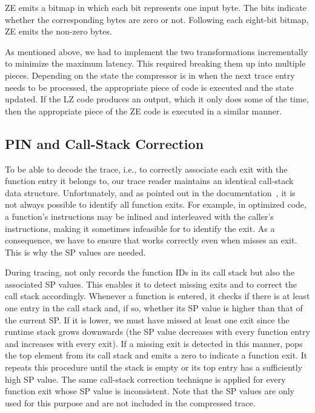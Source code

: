 ZE emits a bitmap in which each bit represents one input byte. The bits indicate whether the corresponding bytes are zero or not. Following each eight-bit bitmap, ZE emits the non-zero bytes.

As mentioned above, we had to implement the two transformations incrementally to minimize the maximum latency. This required breaking them up into multiple pieces. Depending on the state the compressor is in when the next trace entry needs to be processed, the appropriate piece of code is executed and the state updated. If the LZ code produces an output, which it only does some of the time, then the appropriate piece of the ZE code is executed in a similar manner.


\subsection{PIN and Call-Stack Correction}
\label{subsec:stack_cor}

To be able to decode the trace, i.e., to correctly associate each exit with the function entry it belongs to, our trace reader maintains an identical call-stack data structure. Unfortunately, and as pointed out in the \pin documentation~\cite{pinurl}, it is not always possible to identify all function exits. For example, in optimized code, a function's instructions may be inlined and interleaved with the caller's instructions, making it sometimes infeasible for \pin to identify the exit. As a consequence, we have to ensure that \parlot works correctly even when \pin misses an exit. This is why the SP values are needed.

During tracing, \parlot not only records the function IDs in its call stack but also the associated SP values. This enables it to detect missing exits and to correct the call stack accordingly. Whenever a function is entered, it checks if there is at least one entry in the call stack and, if so, whether its SP value is higher than that of the current SP. If it is lower, we must have missed at least one exit since the runtime stack grows downwards (the SP value decreases with every function entry and increases with every exit). If a missing exit is detected in this manner, \parlot pops the top element from its call stack and emits a zero to indicate a function exit. It repeats this procedure until the stack is empty or its top entry has a sufficiently high SP value. The same call-stack correction technique is applied for every function exit whose SP value is inconsistent. Note that the SP values are only used for this purpose and are not included in the compressed trace.

